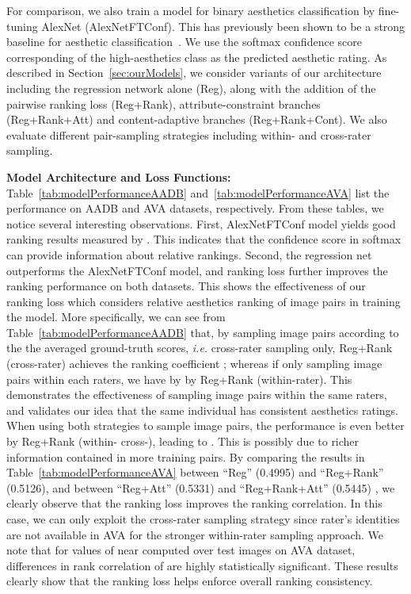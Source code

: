 \documentclass[runningheads]{llncs}
\def\ie{\emph{i.e. }}
\begin{document}
For comparison, we also train a model for binary aesthetics
classification by fine-tuning AlexNet (AlexNetFTConf).  This has
previously been shown to be a strong baseline for aesthetic
classification~\cite{xin2015iccv}.  We use the softmax confidence score
corresponding of the high-aesthetics class as the predicted aesthetic rating.
As described in Section~\ref{sec:ourModels}, we consider variants of
our architecture including the regression network alone (Reg),
along with the
addition of the pairwise ranking loss (Reg+Rank), attribute-constraint
branches (Reg+Rank+Att) and content-adaptive branches (Reg+Rank+Cont).
We also evaluate different pair-sampling strategies including within- and
cross-rater sampling.

\vspace{2mm}
\noindent \textbf{Model Architecture and Loss Functions:}
Table~\ref{tab:modelPerformanceAADB} and~\ref{tab:modelPerformanceAVA}
list the performance on AADB and AVA datasets, respectively.  From these
tables, we notice several interesting observations.  First,
AlexNetFTConf model yields good ranking results measured by .
This indicates that the confidence score in softmax can
provide information about relative rankings. Second, the regression net outperforms the AlexNetFTConf model, and ranking loss further
improves the ranking performance on both datasets.  This shows the
effectiveness of our ranking loss which considers relative aesthetics
ranking of image pairs in training the model.
More specifically,
we can see from Table~\ref{tab:modelPerformanceAADB} that,
by sampling image pairs according to the the averaged ground-truth scores, \ie cross-rater sampling only,
Reg+Rank (cross-rater) achieves the ranking coefficient ;
whereas if only sampling image pairs within each raters,
we have  by by Reg+Rank (within-rater).
This demonstrates the effectiveness of sampling image pairs within the same raters,
and validates our idea that the same individual has consistent aesthetics ratings.
When using both strategies to sample image pairs,
the performance is even better by Reg+Rank (within-  cross-), leading to .
This is possibly due to richer information contained in more training pairs.
By comparing the results in Table~\ref{tab:modelPerformanceAVA} between ``Reg''
(0.4995) and ``Reg+Rank'' (0.5126), and between ``Reg+Att'' (0.5331) and
``Reg+Rank+Att'' (0.5445) , we clearly observe that the ranking loss improves the ranking correlation.  In this case, we can only exploit the cross-rater sampling strategy since
rater's identities are not available in AVA for the stronger within-rater
sampling approach.
We note that for values of  near  computed over  test images on
AVA dataset, differences in rank correlation of  are highly statistically
significant.  These results clearly show that the ranking loss helps enforce
overall ranking consistency.
\end{document}
